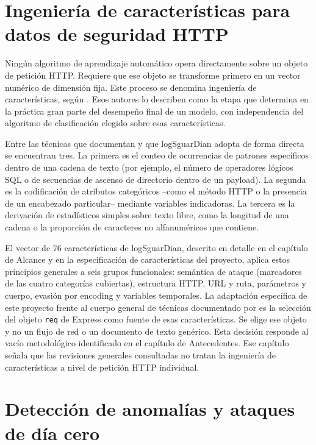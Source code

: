 \section{Ingeniería de características para datos de seguridad HTTP}

Ningún algoritmo de aprendizaje automático opera directamente sobre un objeto de petición HTTP. Requiere que ese objeto se transforme primero en un vector numérico de dimensión fija. Este proceso se denomina ingeniería de características, según \textcite{zheng2018}. Esos autores lo describen como la etapa que determina en la práctica gran parte del desempeño final de un modelo, con independencia del algoritmo de clasificación elegido sobre esas características.

Entre las técnicas que documentan y que logSguarDian adopta de forma directa se encuentran tres. La primera es el conteo de ocurrencias de patrones específicos dentro de una cadena de texto (por ejemplo, el número de operadores lógicos SQL o de secuencias de ascenso de directorio dentro de un payload). La segunda es la codificación de atributos categóricos --como el método HTTP o la presencia de un encabezado particular-- mediante variables indicadoras. La tercera es la derivación de estadísticos simples sobre texto libre, como la longitud de una cadena o la proporción de caracteres no alfanuméricos que contiene.

El vector de 76 características de logSguarDian, descrito en detalle en el capítulo de Alcance y en la especificación de características del proyecto, aplica estos principios generales a seis grupos funcionales: semántica de ataque (marcadores de las cuatro categorías cubiertas), estructura HTTP, URL y ruta, parámetros y cuerpo, evasión por encoding y variables temporales. La adaptación específica de este proyecto frente al cuerpo general de técnicas documentado por \textcite{zheng2018} es la selección del objeto \texttt{req} de Express como fuente de esas características. Se elige ese objeto y no un flujo de red o un documento de texto genérico. Esta decisión responde al vacío metodológico identificado en el capítulo de Antecedentes. Ese capítulo señala que las revisiones generales consultadas no tratan la ingeniería de características a nivel de petición HTTP individual.

\section{Detección de anomalías y ataques de día cero}

